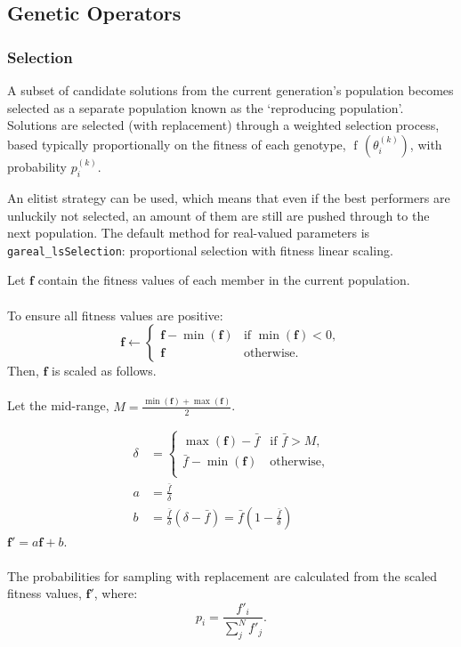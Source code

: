 \documentclass[
  a4paper,
]{article}
\newcommand{\B}[1]{\boldsymbol{#1}}
\newcommand{\+}{\phantom{-}}
\newcommand{\op}[2]{\operatorname{#1}\left(#2\right)}
\begin{document}
\subsection{Genetic Operators}\label{genetic-operators}

\subsubsection{\texorpdfstring{\textbf{Selection}}{Selection}}\label{selection}

A subset of candidate solutions from the current generation's population
becomes selected as a separate population known as the `reproducing
population'. Solutions are selected (with replacement) through a
weighted selection process, based typically proportionally on the
fitness of each genotype, \(\op{f\!}{\theta_i^{\left(k\right)}}\), with
probability \(p_i^{\left(k\right)}\).

An elitist strategy can be used, which means that even if the best
performers are unluckily not selected, an amount of them are still are
pushed through to the next population. The default method for
real-valued parameters is \texttt{gareal\_lsSelection}: proportional
selection with fitness linear scaling.

\begin{tcolorbox}[title=Selection with linear scaling: \texttt{gareal\_lsSelection()}]
Let $\B f$ contain the fitness values of each member in the current population.\\
\\
To ensure all fitness values are positive:
$$
\B f \leftarrow \begin{cases}
\B f- \op{min}{\B f} & \text{if } \op{min}{\B f} < 0,\\
\B f & \text{otherwise.}
\end{cases}
$$
Then, $\B f$ is scaled as follows.\\
\\
Let the mid-range, $M=\frac{\op{min}{\B f} +\op{max}{\B f}}2$.

$$
\begin{aligned}
\delta &=
\begin{cases}
\op{max}{\B f} - \bar f 
& \text{if } \bar f > M,
\\
\bar f -\op{min}{\B f} 
& \text{otherwise,}
\\
\end{cases}
\\
a&= 
\frac{\bar f}{\delta} \\
b&= 
\frac{\bar f}{\delta}\left(\delta - \bar f\right) = \bar f(1-\frac{\bar f}{\delta})
\end{aligned}
$$
$\B f' = a\B f + b$.\\
\\
The probabilities for sampling with replacement are calculated from the scaled fitness values, $\B f'$, where:
$$ p_i = \frac{f'_i}{\sum_j^Nf'_j}.$$

\end{tcolorbox}
\end{document}
